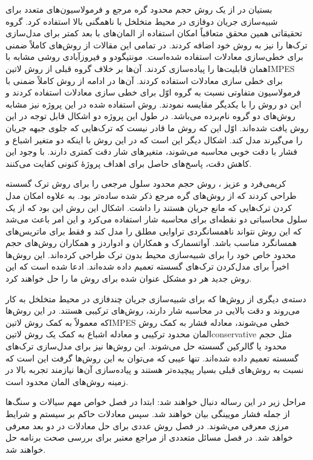 بستیان در  از یک روش حجم محدود گره مرجع و فرمولاسیون‌های متعدد  برای شبیه‌سازی  جریان دوفازی در محیط متخلخل با ناهمگنی بالا استفاده کرد. گروه تحقیقاتی همین محقق متعاقباً امکان استفاده از المان‌های با بعد کمتر برای مدل‌سازی ترک‌ها را نیز به روش خود اضافه کردند. در تمامی این مقالات از روش‌های کاملاً ضمنی برای خطی‌سازی  معادلات استفاده شده‌است. مونتیگودو و فیروزآبادی روشی مشابه با همان قابلیت‌ها را پیاده‌سازی کردند. آن‌ها بر خلاف گروه قبلی از روش  ‌لاتین{IMPES} برای خطی سازی معادلات استفاده کردند. آن‌ها در ادامه از روش کاملاً ضمنی با فرمولاسیون متفاوتی نسبت به گروه اوّل برای خطی سازی معادلات استفاده کردند  و این دو روش را با یکدیگر مقایسه نمودند. روش استفاده شده در این پروژه نیز مشابه روش‌های دو گروه نام‌برده  می‌باشد. در طول این پروژه دو اشکال قابل توجه در این روش یافت شده‌اند. اوّل این که روش ما قادر نیست که ترک‌هایی که جلوی جبهه جریان را می‌گیرند مدل کند. اشکال دیگر این  است که در این روش با اینکه دو متغیر اشباع و فشار با دقت خوبی محاسبه می‌شوند، متغیرهای شار دقت کمتری دارند. با وجود این کاهش دقت، پاسخ‌های حاصل برای اهداف پروژهٔ کنونی کفایت می‌کنند.

کریمی‌فرد و عزیز ، روش حجم محدود سلول مرجعی را برای روش ترک گسسته طراحی کردند که از روش‌های گره مرجع
 ذکر شده ساده‌تر بود. به علاوه امکان مدل کردن ترک‌هایی که مانع جریان هستند را داشت. اشکال این روش این بود که از یک سلول محاسباتی  دو نقطه‌ای برای محاسبه شار استفاده می‌کرد و این امر باعث می‌شد که این روش نتواند ناهمسانگردی تراوایی مطلق را مدل کند و فقط برای ماتریس‌های همسانگرد مناسب باشد. آواتسمارک و همکاران و ادواردز و همکاران روش‌های حجم محدود خاص خود را برای شبیه‌سازی محیط بدون ترک طراحی کرده‌اند. این روش‌ها اخیراً برای مدل‌کردن ترک‌های گسسته تعمیم داده شده‌اند. ادعا شده است که این روش جدید هر دو مشکل عنوان شده برای روش ما را حل خواهند کرد.

دسته‌ی دیگری از روش‌ها که برای شبیه‌سازی جریان چند‌فازی در محیط متخلخل به کار می‌روند و دقت بالایی در محاسبه شار دارند، روش‌های ترکیبی هستند. در این روش‌ها که معمولاً به کمک روش ‌لاتین{IMPES} خطی می‌شوند، معادله فشار به کمک روش المان محدود ترکیبی و معادله اشباع به کمک یک روش ‌لاتین{conservative} مثل حجم محدود یا گالرکین گسسته حل می‌شوند. این روش‌ها نیز برای مدل‌سازی ترک‌های گسسته تعمیم داده شده‌اند. تنها عیبی که می‌توان به این روش‌ها گرفت این است که نسبت به روش‌های قبلی بسیار پیچیده‌تر هستند و پیاده‌سازی آن‌ها نیازمند تجربه بالا در زمینه روش‌های المان محدود است.


مراحل زیر در این رساله دنبال خواهند شد:
 ابتدا در فصل  خواص مهم سیالات و سنگ‌ها از جمله فشار مویینگی بیان خواهند شد. سپس معادلات حاکم بر سیستم و شرایط مرزی معرفی می‌شوند.
 در فصل  روش عددی برای حل معادلات در دو بعد معرفی خواهد شد.
 در فصل  مسائل متعددی از مراجع معتبر برای بررسی صحت برنامه حل خواهند شد.
